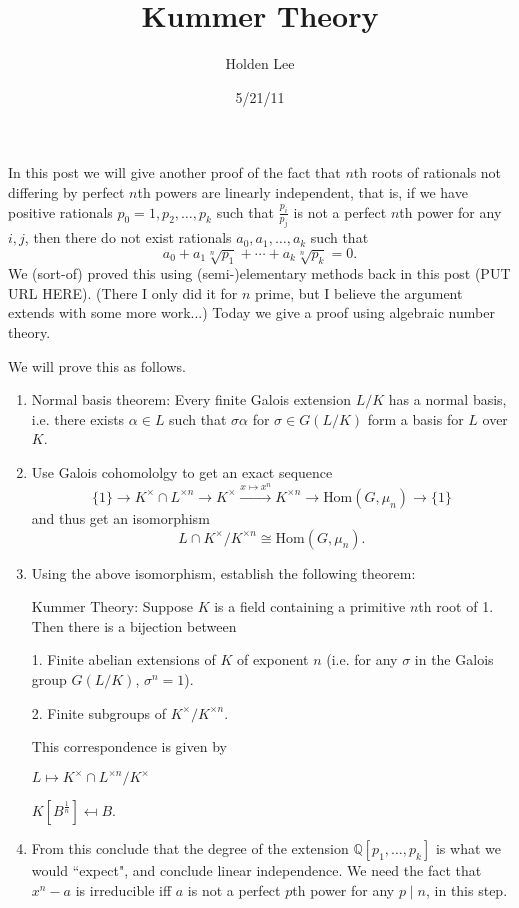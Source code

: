 \documentclass[12pt]{article}
\theoremstyle{norm}
\newcommand{\al}[0]{\alpha}
\newcommand{\si}[0]{\sigma}
\begin{document}
\title{Kummer Theory}%
\author{Holden Lee}
\date{5/21/11}%
\maketitle
\thispagestyle{empty}

In this post we will give another proof of the fact that $n$th roots of rationals not differing by perfect $n$th powers are linearly independent, that is, if we have positive rationals $p_0=1,p_2,\ldots, p_k$ such that $\frac{p_i}{p_j}$ is not a perfect $n$th power for any $i,j$, then there do not exist rationals $a_0,a_1,\ldots, a_k$ such that
\[
a_0+a_1\sqrt[n]{p_1}+\cdots +a_k\sqrt[n]{p_k}=0.
\]
We (sort-of) proved this using (semi-)elementary methods back in this post (PUT URL HERE). 
(There I only did it for $n$ prime, but I believe the argument extends with some more work...) 
Today we give a proof using algebraic number theory.

%

We will prove this as follows.
\begin{enumerate}
\item
Normal basis theorem: Every finite Galois extension $L/K$ has a normal basis, i.e. there exists $\alpha\in L$ such that $\sigma \alpha$ for $\sigma\in G(L/K)$ form a basis for $L$ over $K$.
\item
Use Galois cohomololgy to get an exact sequence
\[
\{1\}\to K^{\times}\cap L^{\times n}\to K^{\times}\xrightarrow{x\mapsto x^n} K^{\times n} \to \text{Hom}(G, \mu_n)\to \{1\}
\]
and thus get an isomorphism
\[
L\cap K^{\times}/K^{\times n}\cong \text{Hom}(G,\mu_n).
\]
\item Using the above isomorphism, establish the following theorem:

Kummer Theory: Suppose $K$ is a field containing a primitive $n$th root of 1. Then there is a bijection between

1. Finite abelian extensions of $K$ of exponent $n$ (i.e. for any $\si$ in the Galois group $G(L/K)$, $\si^n=1$).

2. Finite subgroups of $K^{\times}/K^{\times n}$.

This correspondence is given by

$
\displaystyle
L\mapsto K^{\times }\cap L^{\times n}/K^{\times}
$

$
\displaystyle
K[B^{\frac{1}{n}}]\mapsfrom B.
$
\item From this conclude that the degree of the extension $\mathbb Q[p_1,\ldots, p_k]$ is what we would ``expect", and conclude linear independence. We need the fact that $x^n-a$ is irreducible iff $a$ is not a perfect $p$th power for any $p\mid n$, in this step.
\end{enumerate}
\end{document}
